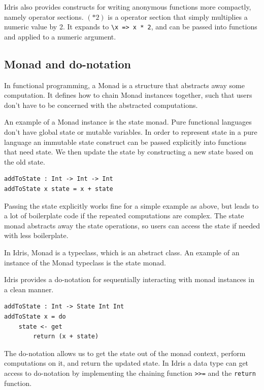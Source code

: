 \documentclass[12pt]{article}
\begin{document}
Idris also provides constructs for writing anonymous functions more compactly, namely operator sections.
$(*2)$ is a operator section that simply multiplies a numeric value by 2.
It expands to \lstinline{\x => x * 2}, and can be passed into functions and applied to a numeric argument.

\subsection{Monad and do-notation}

In functional programming, a Monad is a structure that abstracts away some computation.
It defines how to chain Monad instances together, such that users don't have to be concerned with the abstracted computations.

An example of a Monad instance is the state monad.
Pure functional languages don't have global state or mutable variables.
In order to represent state in a pure language an immutable state construct can be passed explicitly into functions that need state.
We then update the state by constructing a new state based on the old state.

\begin{lstlisting}
addToState : Int -> Int -> Int
addToState x state = x + state
\end{lstlisting}

Passing the state explicitly works fine for a simple example as above, but leads to a lot of boilerplate code if the repeated computations are complex.
The state monad abstracts away the state operations, so users can access the state if needed with less boilerplate.

In Idris, Monad is a typeclass, which is an abstract class.
An example of an instance of the Monad typeclass is the state monad.

Idris provides a do-notation for sequentially interacting with monad instances in a clean manner.

\begin{lstlisting}
addToState : Int -> State Int Int
addToState x = do
   	state <- get
        return (x + state)
\end{lstlisting}

The do-notation allows us to get the state out of the monad context, perform computations on it, and return the updated state.
In Idris a data type can get access to do-notation by implementing the chaining function \lstinline{>>=} and the \lstinline{return} function.
\end{document}
